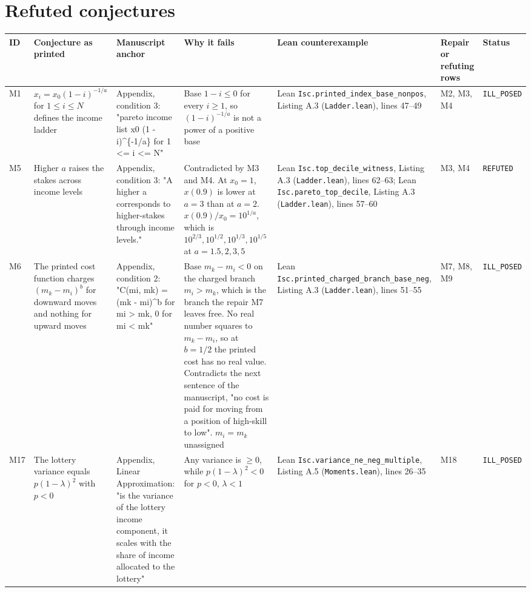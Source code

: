 \documentclass[10pt]{article}
\begin{document}
\section{Refuted conjectures}
{\small
\begin{longtable}{>{\raggedright\arraybackslash}p{0.8cm} >{\raggedright\arraybackslash}p{3.8cm} >{\raggedright\arraybackslash}p{3.9cm} >{\raggedright\arraybackslash}p{5.2cm} >{\raggedright\arraybackslash}p{4.2cm} >{\raggedright\arraybackslash}p{2.2cm} >{\raggedright\arraybackslash}p{2.3cm}}
\toprule ID & Conjecture as printed & Manuscript anchor & Why it fails & Lean counterexample & Repair or refuting rows & Status \\ \midrule \endhead
M1 & $x_i = x_0(1-i)^{-1/a}$ for $1 \le i \le N$ defines the income ladder & Appendix, condition 3: "pareto income list x0 (1 - i)\textasciicircum{}\{-1/a\} for 1 \textless{}= i \textless{}= N" & Base $1-i\le 0$ for every $i\ge 1$, so $(1-i)^{-1/a}$ is not a power of a positive base & Lean \nolinkurl{Isc.printed_index_base_nonpos}, Listing A.3 (\nolinkurl{Ladder.lean}), lines 47--49 & M2, M3, M4 & \texttt{ILL\_POSED} \\ \midrule
M5 & Higher $a$ raises the stakes across income levels & Appendix, condition 3: "A higher a corresponds to higher-stakes through income levels." & Contradicted by M3 and M4. At $x_0=1$, $x(0.9)$ is lower at $a=3$ than at $a=2$. $x(0.9)/x_0=10^{1/a}$, which is $10^{2/3}, 10^{1/2}, 10^{1/3}, 10^{1/5}$ at $a=1.5,2,3,5$ & Lean \nolinkurl{Isc.top_decile_witness}, Listing A.3 (\nolinkurl{Ladder.lean}), lines 62--63; Lean \nolinkurl{Isc.pareto_top_decile}, Listing A.3 (\nolinkurl{Ladder.lean}), lines 57--60 & M3, M4 & \texttt{REFUTED} \\ \midrule
M6 & The printed cost function charges $(m_k-m_i)^b$ for downward moves and nothing for upward moves & Appendix, condition 2: "C(mi, mk) = (mk - mi)\textasciicircum{}b for mi \textgreater{} mk, 0 for mi \textless{} mk" & Base $m_k-m_i<0$ on the charged branch $m_i>m_k$, which is the branch the repair M7 leaves free. No real number squares to $m_k-m_i$, so at $b=1/2$ the printed cost has no real value. Contradicts the next sentence of the manuscript, "no cost is paid for moving from a position of high-skill to low". $m_i=m_k$ unassigned & Lean \nolinkurl{Isc.printed_charged_branch_base_neg}, Listing A.3 (\nolinkurl{Ladder.lean}), lines 51--55 & M7, M8, M9 & \texttt{ILL\_POSED} \\ \midrule
M17 & The lottery variance equals $p(1-\lambda)^2$ with $p<0$ & Appendix, Linear Approximation: "is the variance of the lottery income component, it scales with the share of income allocated to the lottery" & Any variance is $\ge 0$, while $p(1-\lambda)^2<0$ for $p<0$, $\lambda<1$ & Lean \nolinkurl{Isc.variance_ne_neg_multiple}, Listing A.5 (\nolinkurl{Moments.lean}), lines 26--35 & M18 & \texttt{ILL\_POSED} \\ \midrule
\end{longtable}}
\end{document}
